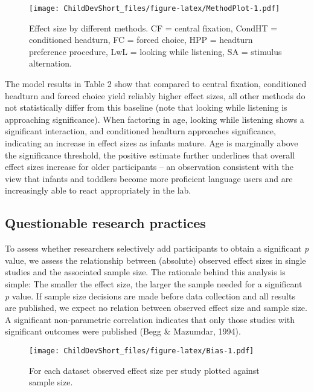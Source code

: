 \documentclass[english,floatsintext,man]{apa6}
\begin{document}
\begin{figure}[htbp]
\centering
\texttt{[image: ChildDevShort\_files/figure-latex/MethodPlot-1.pdf]}
\caption{\label{fig:MethodPlot}Effect size by different methods. CF =
central fixation, CondHT = conditioned headturn, FC = forced choice, HPP
= headturn preference procedure, LwL = looking while listening, SA =
stimulus alternation.}
\end{figure}

The model results in Table 2 show that compared to central fixation,
conditioned headturn and forced choice yield reliably higher effect
sizes, all other methods do not statistically differ from this baseline
(note that looking while listening is approaching significance). When
factoring in age, looking while listening shows a significant
interaction, and conditioned headturn approaches significance,
indicating an increase in effect sizes as infants mature. Age is
marginally above the significance threshold, the positive estimate
further underlines that overall effect sizes increase for older
participants -- an observation consistent with the view that infants and
toddlers become more proficient language users and are increasingly able
to react appropriately in the lab.

\subsection{Questionable research
practices}\label{questionable-research-practices-1}

To assess whether researchers selectively add participants to obtain a
significant \emph{p} value, we assess the relationship between
(absolute) observed effect sizes in single studies and the associated
sample size. The rationale behind this analysis is simple: The smaller
the effect size, the larger the sample needed for a significant \emph{p}
value. If sample size decisions are made before data collection and all
results are published, we expect no relation between observed effect
size and sample size. A significant non-parametric correlation indicates
that only those studies with significant outcomes were published (Begg
\& Mazumdar, 1994).

\begin{figure}[htbp]
\centering
\texttt{[image: ChildDevShort\_files/figure-latex/Bias-1.pdf]}
\caption{\label{fig:Bias}For each dataset observed effect size per study
plotted against sample size.}
\end{figure}
\end{document}
